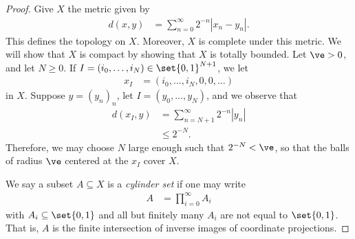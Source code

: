 \documentclass[10pt]{mypackage}
\begin{document}
\begin{proof}
  Give $X$ the metric given by
  \begin{align*}
    d\left( x,y \right) &= \sum_{n=0}^{\infty} 2^{-n}\left\vert x_n-y_n \right\vert.
  \end{align*}
  This defines the topology on $X$. Moreover, $X$ is complete under this metric. We will show that $X$ is compact by showing that $X$ is totally bounded. Let $\ve > 0$, and let $N\geq 0$. If $I = \left( i_0,\dots,i_N \right)\in \set{0,1}^{N+1}$, we let 
  \begin{align*}
    x_I &= \left( i_0,\dots,i_N,0,0,\dots \right)
  \end{align*}
  in $X$. Suppose $y = \left( y_n \right)_{n}$, let $I = \left( y_0,\dots,y_N \right)$, and we observe that 
  \begin{align*}
    d\left( x_I,y \right) &= \sum_{n=N+1}^{\infty} 2^{-n} \left\vert y_n \right\vert\\
                          &\leq 2^{-N}.
  \end{align*}
  Therefore, we may choose $N$ large enough such that $2^{-N} < \ve$, so that the balls of radius $\ve$ centered at the $x_I$ cover $X$.

  We say a subset $A\subseteq X$ is a \textit{cylinder set} if one may write
  \begin{align*}
    A &= \prod_{i=0}^{\infty} A_i
  \end{align*}
  with $A_i\subseteq \set{0,1}$ and all but finitely many $A_i$ are not equal to $\set{0,1}$. That is, $A$ is the finite intersection of inverse images of coordinate projections.


\end{proof}
\end{document}
